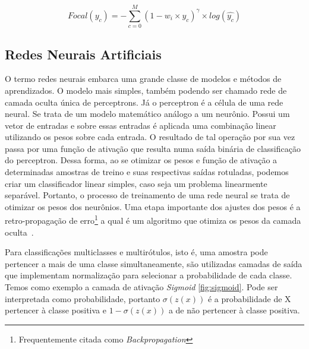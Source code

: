 $$Focal(y_c) = -\sum_{c=0}^{M} (1-w_i \times y_c)^\gamma \times log(\hat{y_c})$$

\subsection{Redes Neurais Artificiais}\label{sec:Cap2_redes_neurais}

O termo redes neurais embarca uma grande classe de modelos e métodos de aprendizados. O modelo mais simples, também podendo ser chamado rede de camada oculta única de perceptrons. Já o  perceptron é a célula de uma rede neural. Se trata de um modelo matemático análogo a um neurônio. Possui um vetor de entradas e sobre essas entradas é aplicada uma combinação linear utilizando os pesos sobre cada entrada. O resultado de tal operação por sua vez passa por uma função de ativação que resulta numa saída binária de classificação do perceptron. Dessa forma, ao se otimizar os pesos e função de ativação a determinadas amostras de treino e suas respectivas saídas rotuladas, podemos criar um classificador linear simples, caso seja um problema linearmente separável. Portanto, o processo de treinamento de uma rede neural se trata de otimizar os pesos dos neurônios. 
Uma etapa importante dos ajustes dos pesos é a retro-propagação de erro\footnote{Frequentemente citada como \textit{Backpropagation}} a qual é um algoritmo que otimiza os pesos da camada oculta~\cite{hastie01statisticallearning}. 

Para classificações multiclasses e multirótulos, isto é, uma amostra pode pertencer a mais de uma classe simultaneamente, são utilizadas camadas de saída que implementam normalização para selecionar a probabilidade de cada classe. Temos como exemplo a camada de ativação \textit{Sigmoid} \ref{fig:sigmoid}. 
Pode ser interpretada como probabilidade, portanto $\sigma(z(x))$ é a probabilidade de X pertencer à classe positiva e $1-\sigma(z(x))$ a de não pertencer à classe positiva.

